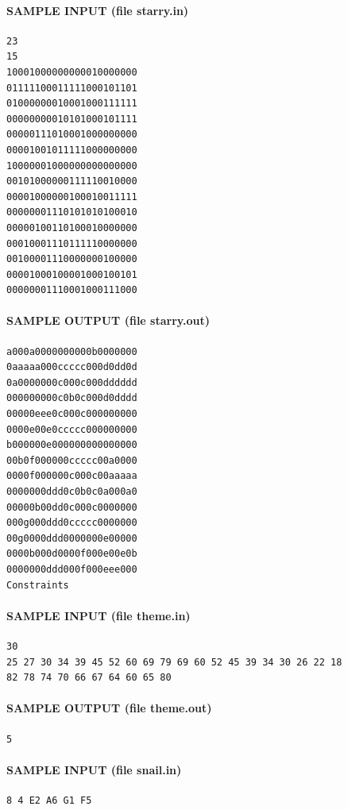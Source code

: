 \documentclass[11pt]{article}
\begin{document}
\paragraph{SAMPLE INPUT (file starry.in)}
\begin{verbatim}
23
15
10001000000000010000000
01111100011111000101101
01000000010001000111111
00000000010101000101111
00000111010001000000000
00001001011111000000000
10000001000000000000000
00101000000111110010000
00001000000100010011111
00000001110101010100010
00000100110100010000000
00010001110111110000000
00100001110000000100000
00001000100001000100101
00000001110001000111000
\end{verbatim}

\paragraph{SAMPLE OUTPUT (file starry.out)}
\begin{verbatim}
a000a0000000000b0000000
0aaaaa000ccccc000d0dd0d
0a0000000c000c000dddddd
000000000c0b0c000d0dddd
00000eee0c000c000000000
0000e00e0ccccc000000000
b000000e000000000000000
00b0f000000ccccc00a0000
0000f000000c000c00aaaaa
0000000ddd0c0b0c0a000a0
00000b00dd0c000c0000000
000g000ddd0ccccc0000000
00g0000ddd0000000e00000
0000b000d0000f000e00e0b
0000000ddd000f000eee000
Constraints
\end{verbatim}

\paragraph{SAMPLE INPUT (file theme.in)}
\begin{verbatim}
30
25 27 30 34 39 45 52 60 69 79 69 60 52 45 39 34 30 26 22 18
82 78 74 70 66 67 64 60 65 80
\end{verbatim}

\paragraph{SAMPLE OUTPUT (file theme.out)}
\begin{verbatim}
5
\end{verbatim}

\paragraph{SAMPLE INPUT (file snail.in)}
\begin{verbatim}
8 4 E2 A6 G1 F5
\end{verbatim}
\end{document}
